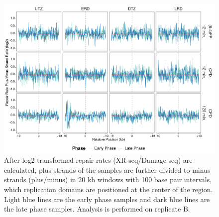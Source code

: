 \begin{figure}[H]
\begin{center}
\includegraphics[width=\textwidth]{Chapters/7_appendix/figures/supfig31}
\caption[Repair rate plus/minus phase ratio of replication domains in 20 kb (replicate B).]{After log2 transformed repair rates (XR-seq/Damage-seq) are calculated, plus strands of the samples are further divided to minus strands (plus/minus) in 20 kb windows with 100 base pair intervals, which replication domains are positioned at the center of the region. Light blue lines are the early phase samples and dark blue lines are the late phase samples. Analysis is performed on replicate B.}
\label{supfig:rrpm20repdomainB}
\end{center}
\end{figure}

